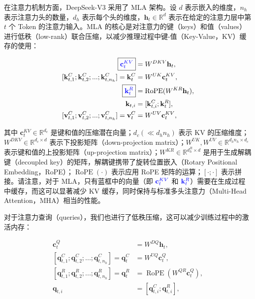 \documentclass[lang=cn,a4paper,newtx]{elegantpaper}
\newcommand{\dsattn}{MLA}
\newcommand{\dsviii}{DeepSeek-V3}
\begin{document}
在注意力机制方面，\dsviii{} 采用了 \dsattn{} 架构。设 $d$ 表示嵌入的维度，$n_h$ 表示注意力头的数量，$d_h$ 表示每个头的维度，$\mathbf{h}_{t} \in \mathbb{R}^{d}$ 表示在给定的注意力层中第 $t$ 个 Token 的注意力输入。\dsattn{} 的核心是对注意力的键（keys）和值（values）进行低秩（low-rank）联合压缩，以减少推理过程中键-值（Key-Value，KV）缓存的使用：

\begin{align}
    \boxed{\color{blue} \mathbf{c}_{t}^{KV}} &= W^{DKV} \mathbf{h}_{t}, \\
    [\mathbf{k}_{t, 1}^{C};\mathbf{k}_{t, 2}^{C};...;\mathbf{k}_{t, n_{h}}^{C}] = \mathbf{k}_{t}^{C} &= W^{UK} \mathbf{c}_{t}^{KV}, \\
    \boxed{\color{blue}\mathbf{k}_{t}^{R}} &= \operatorname{RoPE}({W^{KR}} \mathbf{h}_{t}), \\
    \mathbf{k}_{t, i} &= [\mathbf{k}_{t, i}^{C}; \mathbf{k}_{t}^{R}], \\
    [\mathbf{v}_{t, 1}^{C};\mathbf{v}_{t, 2}^{C};...;\mathbf{v}_{t, n_{h}}^{C}] = \mathbf{v}_{t}^{C} &= W^{UV} \mathbf{c}_{t}^{KV}, 
\end{align}

其中 $\mathbf{c}_{t}^{KV} \in \mathbb{R}^{d_c}$ 是键和值的压缩潜在向量；$d_c (\ll d_h n_h)$ 表示 KV 的压缩维度；$W^{DKV} \in \mathbb{R}^{d_c \times d}$ 表示下投影矩阵（down-projection matrix）；$W^{UK}, W^{UV} \in \mathbb{R}^{d_h n_h \times d_c}$ 表示键和值的上投影矩阵（up-projection matrix）；$W^{KR} \in \mathbb{R}^{d_h^R \times d}$ 是用于生成解耦键（decoupled key）的矩阵，解耦键携带了旋转位置嵌入（Rotary Positional Embedding，RoPE）；$\operatorname{RoPE}(\cdot)$ 表示应用 RoPE 矩阵的运算；$[\cdot;\cdot]$ 表示拼接。请注意，对于 MLA，只有蓝框中的向量（即 $\color{blue} \mathbf{c}_{t}^{KV}$ 和 $\color{blue}\mathbf{k}_{t}^{R}$）需要在生成过程中缓存，而这可以显著减少 KV 缓存，同时保持与标准多头注意力（Multi-Head Attention，MHA）相当的性能。

对于注意力查询（queries），我们也进行了低秩压缩，这可以减少训练过程中的激活内存：

\begin{align}
    \mathbf{c}_{t}^{Q} &= W^{DQ} \mathbf{h}_{t}, \\
    [\mathbf{q}_{t, 1}^{C};\mathbf{q}_{t, 2}^{C};...;\mathbf{q}_{t, n_{h}}^{C}] = \mathbf{q}_{t}^{C} &= W^{UQ} \mathbf{c}_{t}^{Q}, \\
    [\mathbf{q}_{t, 1}^{R};\mathbf{q}_{t, 2}^{R};...;\mathbf{q}_{t, n_{h}}^{R}] = \mathbf{q}_{t}^{R} &= \operatorname{RoPE}({W^{QR}} \mathbf{c}_{t}^{Q}), \\
    \mathbf{q}_{t, i} &= [\mathbf{q}_{t, i}^{C}; \mathbf{q}_{t, i}^{R}],
\end{align}
\end{document}
